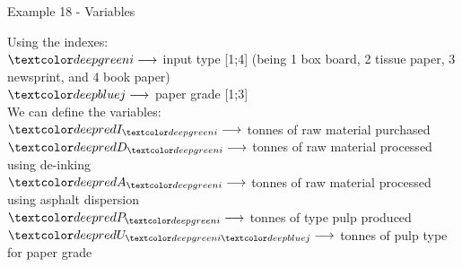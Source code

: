 \begin{frame}{Example 18 - Variables}

{\large Using the indexes:}
\vspace{3mm}\\
\small{
$\colorb{i} \longrightarrow$
    input type [1;4] (being 1 box board, 2 tissue paper, 3 newsprint, and 4 book paper) \\
$\colorc{j} \longrightarrow$
    paper grade [1;3]
}
\vspace{5mm}\\

{\large We can define the variables:}
\vspace{3mm}\\
\small{
$\colorsub{I}{i} \longrightarrow$
    tonnes of raw material  purchased \\
$\colorsub{D}{i} \longrightarrow$
    tonnes of raw material  processed using de-inking \\
$\colorsub{A}{i} \longrightarrow$
    tonnes of raw material  processed using asphalt dispersion \\
$\colorsub{P}{i} \longrightarrow$
    tonnes of type  pulp produced \\
$\colorij{U}{i}{j} \longrightarrow$
    tonnes of pulp type  for paper grade 
}

\end{frame}
